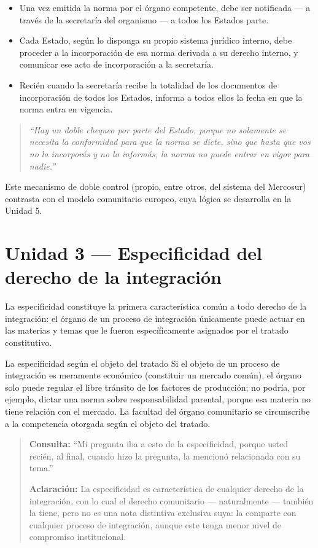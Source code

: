 \documentclass[12pt,oneside]{book}
\begin{document}
\begin{itemize}
    \item Una vez emitida la norma por el órgano competente, debe ser notificada --- a través de la secretaría del organismo --- a todos los Estados parte.
    \item Cada Estado, según lo disponga su propio sistema jurídico interno, debe proceder a la incorporación de esa norma derivada a su derecho interno, y comunicar ese acto de incorporación a la secretaría.
    \item Recién cuando la secretaría recibe la totalidad de los documentos de incorporación de todos los Estados, informa a todos ellos la fecha en que la norma entra en vigencia.
\end{itemize}

\begin{quote}
\itshape ``Hay un doble chequeo por parte del Estado, porque no solamente se necesita la conformidad para que la norma se dicte, sino que hasta que vos no la incorporás y no lo informás, la norma no puede entrar en vigor para nadie.''
\end{quote}

Este mecanismo de doble control (propio, entre otros, del sistema del Mercosur) contrasta con el modelo comunitario europeo, cuya lógica se desarrolla en la Unidad 5.

\section{Unidad 3 --- Especificidad del derecho de la integración}

La especificidad constituye la primera característica común a todo derecho de la integración: el órgano de un proceso de integración únicamente puede actuar en las materias y temas que le fueron específicamente asignados por el tratado constitutivo.

\begin{example}{La especificidad según el objeto del tratado}
Si el objeto de un proceso de integración es meramente económico (constituir un mercado común), el órgano solo puede regular el libre tránsito de los factores de producción; no podría, por ejemplo, dictar una norma sobre responsabilidad parental, porque esa materia no tiene relación con el mercado. La facultad del órgano comunitario se circunscribe a la competencia otorgada según el objeto del tratado.
\end{example}

\begin{quote}
\small
\textbf{Consulta:} ``Mi pregunta iba a esto de la especificidad, porque usted recién, al final, cuando hizo la pregunta, la mencionó relacionada con su tema.''

\textbf{Aclaración:} La especificidad es característica de cualquier derecho de la integración, con lo cual el derecho comunitario --- naturalmente --- también la tiene, pero no es una nota distintiva exclusiva suya: la comparte con cualquier proceso de integración, aunque este tenga menor nivel de compromiso institucional.
\end{quote}
\end{document}
